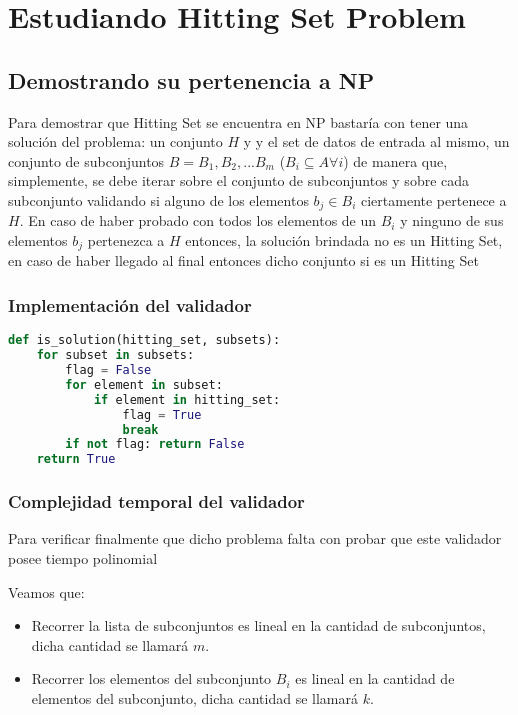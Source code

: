 \section{Estudiando Hitting Set Problem}

\subsection{Demostrando su pertenencia a NP}

Para demostrar que Hitting Set se encuentra en NP bastaría con tener una solución del problema: un conjunto $H$ y y el set de datos de entrada al mismo, un conjunto de subconjuntos $B = B_1, B_2, ... B_m$ ($B_i \subseteq A \forall i$) de manera que, simplemente, se debe iterar sobre el conjunto de subconjuntos y sobre cada subconjunto validando si alguno de los elementos $b_j \in B_i$ ciertamente pertenece a $H$. En caso de haber probado con todos los elementos de un $B_i$ y ninguno de sus elementos $b_j$ pertenezca a $H$ entonces, la solución brindada no es un Hitting Set, en caso de haber llegado al final entonces dicho conjunto si es un Hitting Set

\subsubsection{Implementación del validador}

\begin{lstlisting}[language=Python, caption= validador, label=python_code]
def is_solution(hitting_set, subsets):
    for subset in subsets:
        flag = False
        for element in subset:
            if element in hitting_set: 
                flag = True
                break
        if not flag: return False 
    return True
\end{lstlisting}

\subsubsection{Complejidad temporal del validador}

Para verificar finalmente que dicho problema falta con probar que este validador posee tiempo polinomial

Veamos que: 

\begin{itemize}
    \item Recorrer la lista de subconjuntos es lineal en la cantidad de subconjuntos, dicha cantidad se llamará $m$.
    \item Recorrer los elementos del subconjunto $B_i$ es lineal en la cantidad de elementos del subconjunto, dicha cantidad se llamará $k$.
\end{itemize}

